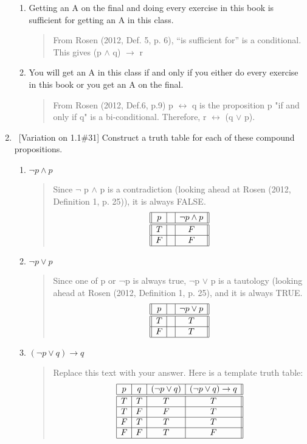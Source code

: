 \documentclass[10pt]{article}
\newcommand{\Answer}[1]{\begin{quote}{\color{blue}#1}\end{quote}}
\begin{document}
\begin{enumerate}
\begin{enumerate}
\item Getting an A on the final and doing every exercise in this book is sufficient for getting an A in this class.\qquad [5 points]
\Answer{From Rosen (2012, Def. 5, p. 6), “is sufficient for” is a conditional. This gives (p $\wedge$ q) $\rightarrow$ r}

\item You will get an A in this class if and only if you either do every exercise in this book or you get an A on the final. \qquad [5 points]
\Answer{From Rosen (2012, Def.6, p.9) p $\leftrightarrow$ q is the proposition p "if and only if q" is a bi-conditional. Therefore, r $\leftrightarrow$ (q $\vee$ p).}

\end{enumerate}
\item \ [Variation on 1.1\#31]  Construct a truth table for each of these compound propositions.
\begin{enumerate}
\item $\lnot p \wedge p$ \qquad [10 points]
\Answer{Since $\lnot$ p $\wedge$ p is a contradiction (looking ahead at Rosen (2012, Definition 1, p. 25)), it is always FALSE.
$$
\begin{array}{||c|c|c||c||}
\hline
p  & & \lnot p \wedge p \\
\hline
\hline
T & & F\\
\hline
F  & & F\\
\hline
\end{array}
$$
}

\item $ \lnot p \vee p$	\qquad [10 points]
\Answer{Since one of p or ¬p is always true, $\lnot$p $\vee$ p is a tautology (looking ahead at Rosen
(2012, Definition 1, p. 25), and it is always TRUE.
$$
\begin{array}{||c|c|c||c||}
\hline
p  && \lnot p \vee p \\
\hline
\hline
T & & T\\
\hline
F  & & T\\
\hline
\end{array}
$$
}

\item $(\lnot p \vee q) \rightarrow q $\qquad [10 points]
\Answer{Replace this text with your answer.  Here is a template truth table:
$$
\begin{array}{|c|c|c|c||c|}
\hline
p & q & (\lnot p \vee q)& (\lnot p \vee q) \rightarrow q   \\
\hline
\hline
T & T & T & T \\
\hline
T & F & F & T \\
\hline
F & T & T & T \\
\hline
F & F & T & F \\
\hline
\end{array}
$$
}


\end{enumerate}
\end{enumerate}
\end{document}
